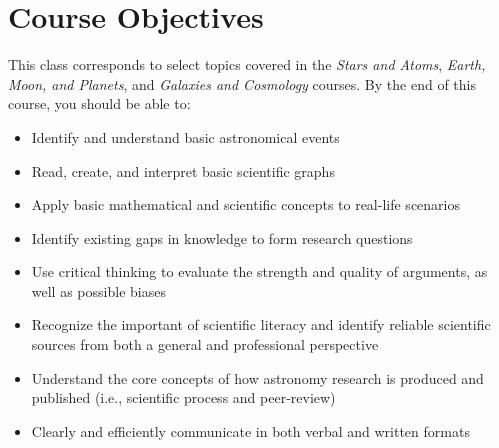 \documentclass[11pt]{article}
\begin{document}
\section*{Course Objectives}
This class corresponds to select topics covered in the \textit{Stars and Atoms}, \textit{Earth, Moon, and Planets}, and \textit{Galaxies and Cosmology} courses.  By the end of this course, you should be able to:
\begin{itemize}
    \item Identify and understand basic astronomical events
    \item Read, create, and interpret basic scientific graphs
     \item Apply basic mathematical and scientific concepts to real-life scenarios
    \item Identify existing gaps in knowledge to form research questions
    \item Use critical thinking to evaluate the strength and quality of arguments, as well as possible biases
    \item Recognize the important of scientific literacy and identify reliable scientific sources from both a general and professional perspective
    \item Understand the core concepts of how astronomy research is produced and published (i.e., scientific process and peer-review)
    \item Clearly and efficiently communicate in both verbal and written formats
\end{itemize}
 
\end{document}
